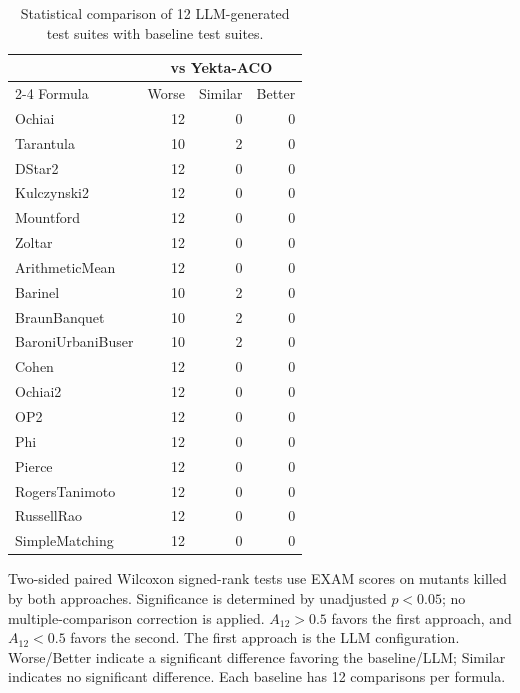 \begin{table}[t]
\centering
\caption{Statistical comparison of 12 LLM-generated test suites with baseline test suites.}
\label{tab:rq3bw-pairwise-counts}
\begin{tabular}{lrrr}
\hline
 & \multicolumn{3}{c}{vs Yekta-ACO} \\
\cline{2-4}
Formula & Worse & Similar & Better \\
\hline
Ochiai & 12 & 0 & 0 \\
Tarantula & 10 & 2 & 0 \\
DStar2 & 12 & 0 & 0 \\
Kulczynski2 & 12 & 0 & 0 \\
Mountford & 12 & 0 & 0 \\
Zoltar & 12 & 0 & 0 \\
ArithmeticMean & 12 & 0 & 0 \\
Barinel & 10 & 2 & 0 \\
BraunBanquet & 10 & 2 & 0 \\
BaroniUrbaniBuser & 10 & 2 & 0 \\
Cohen & 12 & 0 & 0 \\
Ochiai2 & 12 & 0 & 0 \\
OP2 & 12 & 0 & 0 \\
Phi & 12 & 0 & 0 \\
Pierce & 12 & 0 & 0 \\
RogersTanimoto & 12 & 0 & 0 \\
RussellRao & 12 & 0 & 0 \\
SimpleMatching & 12 & 0 & 0 \\
\hline
\end{tabular}
\par\smallskip
\begin{minipage}{\linewidth}\footnotesize Two-sided paired Wilcoxon signed-rank tests use EXAM scores on mutants killed by both approaches. Significance is determined by unadjusted $p<0.05$; no multiple-comparison correction is applied. $A_{12}>0.5$ favors the first approach, and $A_{12}<0.5$ favors the second. The first approach is the LLM configuration. Worse/Better indicate a significant difference favoring the baseline/LLM; Similar indicates no significant difference. Each baseline has 12 comparisons per formula.
\end{minipage}
\end{table}
